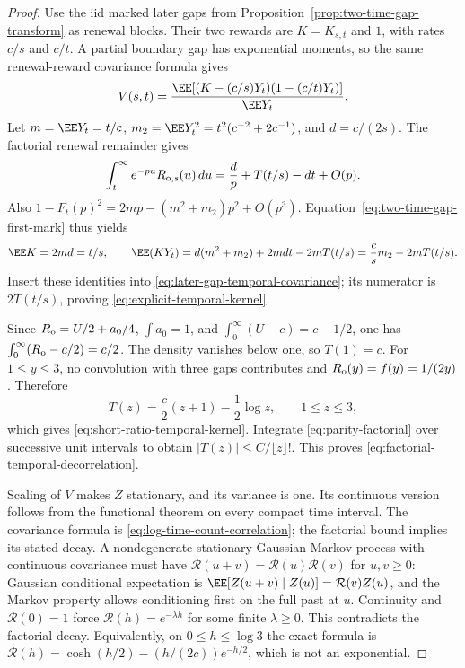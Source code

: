 \documentclass[11pt,letterpaper]{article}
\begin{document}
\begin{proof}
Use the iid marked later gaps from
Proposition~\ref{prop:two-time-gap-transform} as renewal blocks.
Their two rewards are $K=K_{s,t}$ and $1$, with rates $c/s$
and $c/t$. A partial boundary gap has exponential moments,
so the same renewal-reward covariance formula gives
\begin{equation}\label{eq:later-gap-temporal-covariance}
 V(s,t)=\frac{\EE[(K-(c/s)Y_t)(1-(c/t)Y_t)]}{\EE Y_t}.
\end{equation}
Let $m=\EE Y_t=t/c$, $m_2=\EE Y_t^2=t^2(c^{-2}+2c^{-1})$,
and $d=c/(2s)$. The factorial renewal remainder gives
\[
 \int_t^\infty e^{-pu}R_{{\rm o},s}(u)\,du
      =\frac d p+T(t/s)-dt+O(p).
\]
Also $1-F_t(p)^2=2mp-(m^2+m_2)p^2+O(p^3)$.
Equation~\eqref{eq:two-time-gap-first-mark} thus yields
\[
 \EE K=2md=t/s,\qquad
 \EE(KY_t)=d(m^2+m_2)+2mdt-2mT(t/s)
             =\frac c s m_2-2mT(t/s).
\]
Insert these identities into
\eqref{eq:later-gap-temporal-covariance}; its numerator is
$2T(t/s)$, proving \eqref{eq:explicit-temporal-kernel}.

Since $R_{\rm o}=U/2+a_0/4$, $\int a_0=1$, and
$\int_0^\infty(U-c)=c-1/2$, one has
$\int_0^\infty(R_{\rm o}-c/2)=c/2$.
The density vanishes below one, so $T(1)=c$.
For $1\le y\le3$, no convolution with three gaps contributes
and $R_{\rm o}(y)=f(y)=1/(2y)$. Therefore
\[
 T(z)=\frac c2(z+1)-\frac12\log z,\qquad 1\le z\le3,
\]
which gives \eqref{eq:short-ratio-temporal-kernel}.
Integrate \eqref{eq:parity-factorial} over successive unit
intervals to obtain $|T(z)|\le C/\lfloor z\rfloor!$.
This proves \eqref{eq:factorial-temporal-decorrelation}.

Scaling of $V$ makes $Z$ stationary, and its variance is one.
Its continuous version follows from the functional theorem on
every compact time interval. The covariance formula is
\eqref{eq:log-time-count-correlation}; the factorial bound
implies its stated decay. A nondegenerate stationary Gaussian
Markov process with continuous covariance must have
$\mathcal R(u+v)=\mathcal R(u)\mathcal R(v)$ for $u,v\ge0$:
Gaussian conditional expectation is
$\EE[Z(u+v)\mid Z(u)]=\mathcal R(v)Z(u)$, and the Markov
property allows conditioning first on the full past at $u$.
Continuity and $\mathcal R(0)=1$ force
$\mathcal R(h)=e^{-\lambda h}$ for some finite $\lambda\ge0$.
This contradicts the factorial decay. Equivalently, on
$0\le h\le\log3$ the exact formula is
$\mathcal R(h)=\cosh(h/2)-(h/(2c))e^{-h/2}$,
which is not an exponential.
\end{proof}
\end{document}
